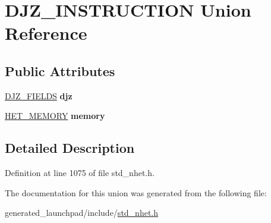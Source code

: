 \hypertarget{unionDJZ__INSTRUCTION}{}\section{D\+J\+Z\+\_\+\+I\+N\+S\+T\+R\+U\+C\+T\+I\+ON Union Reference}
\label{unionDJZ__INSTRUCTION}
\subsection*{Public Attributes}
\begin{DoxyCompactItemize}
\item 
\mbox{\label{unionDJZ__INSTRUCTION_a3d9b4123a9f4c83d6708573dae5380af}} 
\mbox{\hyperlink{structdjz__format}{D\+J\+Z\+\_\+\+F\+I\+E\+L\+DS}} {\bfseries djz}
\item 
\mbox{\label{unionDJZ__INSTRUCTION_ab83404e99fef007c1cd884baf8cd14d8}} 
\mbox{\hyperlink{structmemory__format}{H\+E\+T\+\_\+\+M\+E\+M\+O\+RY}} {\bfseries memory}
\end{DoxyCompactItemize}


\subsection{Detailed Description}


Definition at line 1075 of file std\+\_\+nhet.\+h.



The documentation for this union was generated from the following file\+:\begin{DoxyCompactItemize}
\item 
generated\+\_\+launchpad/include/\mbox{\hyperlink{std__nhet_8h}{std\+\_\+nhet.\+h}}\end{DoxyCompactItemize}
